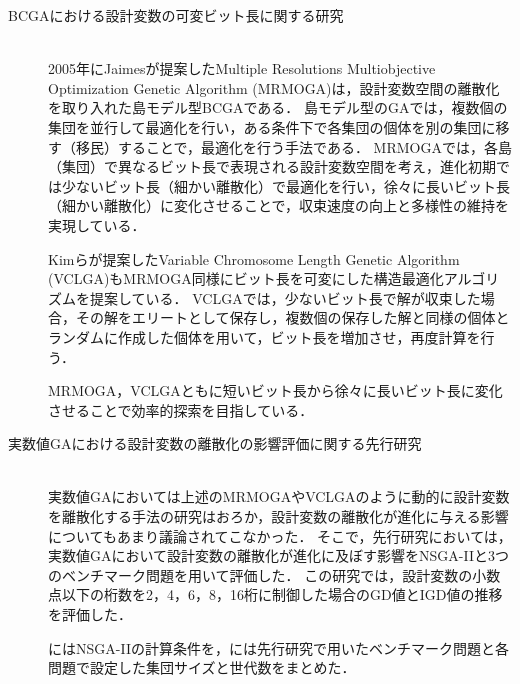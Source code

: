 \documentclass[../main/main]{subfiles}
\begin{document}
\begin{description}

\item[BCGAにおける設計変数の可変ビット長に関する研究]\mbox{}\\
\quad 2005年にJaimesが提案したMultiple Resolutions Multiobjective Optimization Genetic Algorithm (MRMOGA)\cite{Jaimes2005MRMOGA}は，設計変数空間の離散化を取り入れた島モデル型BCGAである．
島モデル型のGAでは，複数個の集団を並行して最適化を行い，ある条件下で各集団の個体を別の集団に移す（移民）することで，最適化を行う手法である．
MRMOGAでは，各島（集団）で異なるビット長で表現される設計変数空間を考え，進化初期では少ないビット長（細かい離散化）で最適化を行い，徐々に長いビット長（細かい離散化）に変化させることで，収束速度の向上と多様性の維持を実現している．

\quad Kimらが提案したVariable Chromosome Length Genetic Algorithm (VCLGA)\cite{Kim2005Variable}もMRMOGA同様にビット長を可変にした構造最適化アルゴリズムを提案している．
VCLGAでは，少ないビット長で解が収束した場合，その解をエリートとして保存し，複数個の保存した解と同様の個体とランダムに作成した個体を用いて，ビット長を増加させ，再度計算を行う．

\quad MRMOGA，VCLGAともに短いビット長から徐々に長いビット長に変化させることで効率的探索を目指している．


\item[実数値GAにおける設計変数の離散化の影響評価に関する先行研究]\mbox{}\\
\quad 実数値GAにおいては上述のMRMOGAやVCLGAのように動的に設計変数を離散化する手法の研究はおろか，設計変数の離散化が進化に与える影響についてもあまり議論されてこなかった．
そこで，先行研究においては，実数値GAにおいて設計変数の離散化が進化に及ぼす影響をNSGA-IIと3つのベンチマーク問題を用いて評価した\cite{近藤2015}．
この研究では，設計変数の小数点以下の桁数を2，4，6，8，16桁に制御した場合のGD値とIGD値の推移を評価した．

\quad {}にはNSGA-IIの計算条件を，には先行研究で用いたベンチマーク問題と各問題で設定した集団サイズと世代数をまとめた．


\end{description}
\end{document}
